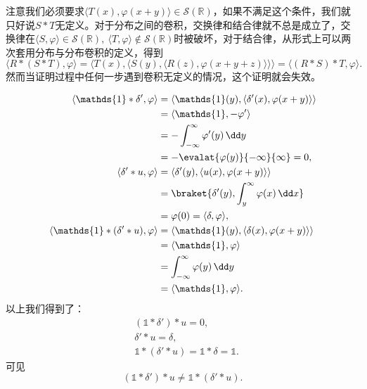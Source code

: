 注意我们必须要求$\langle T(x),\varphi(x+y)\rangle\in\mathcal{S}(\mathbb{R})$，如果不满足这个条件，我们就只好说$S*T$无定义。对于分布之间的卷积，交换律和结合律就不总是成立了，交换律在$\langle S,\varphi\rangle\in\mathcal{S}(\mathbb{R}),\ \langle T,\varphi\rangle\notin\mathcal{S}(\mathbb{R})$时被破坏，对于结合律，从形式上可以两次套用分布与分布卷积的定义，得到
\begin{equation}
    \langle R*(S*T),\varphi\rangle=\langle T(x),\langle S(y),\langle R(z),\varphi(x+y+z)\rangle\rangle\rangle=\langle (R*S)*T,\varphi\rangle.
\end{equation}
然而当证明过程中任何一步遇到卷积无定义的情况，这个证明就会失效。
\begin{example}[结合律的失效]\label{exmp:associative_loss}
    \begin{align}
        \langle\mathds{1}*\delta',\varphi\rangle& =\langle \mathds{1}(y),\langle \delta'(x),\varphi(x+y)\rangle\rangle\nonumber\\
        &=\langle \mathds{1},-\varphi'\rangle\nonumber\\
        &=-\int_{-\infty}^{\infty}\varphi'(y)\,\dd y\nonumber\\
        &=-\evalat{\varphi(y)}{-\infty}{\infty}=0,\\
        \langle \delta'*u,\varphi\rangle&=\langle \delta'(y),\langle u(x),\varphi(x+y)\rangle\rangle\nonumber\\
        &=\braket{\delta'(y),\int_{y}^{\infty}\varphi(x)\,\dd x}\nonumber\\
        &=\varphi(0)=\langle \delta,\varphi\rangle,\\
        \langle\mathds{1}*(\delta'*u),\varphi\rangle&=\langle \mathds{1}(y),\langle \delta(x),\varphi(x+y)\rangle\rangle\nonumber\\
        &=\langle \mathds{1},\varphi\rangle\nonumber\\
        &=\int_{-\infty}^{\infty}\varphi(y)\,\dd y\nonumber\\
        &=\langle \mathds{1},\varphi\rangle.
    \end{align}
    以上我们得到了：
    \begin{align}
        &(\mathds{1}*\delta')*u=0,\\
        &\delta'*u=\delta,\\
        &\mathds{1}*(\delta'*u)=\mathds{1}*\delta=\mathds{1}.
    \end{align}
    可见
    \begin{equation}
        (\mathds{1}*\delta')*u \neq \mathds{1}*(\delta'*u).
    \end{equation}
\end{example}

